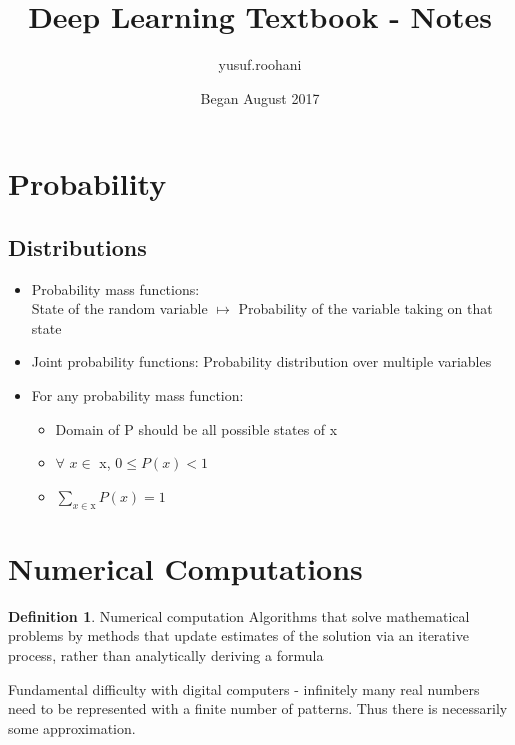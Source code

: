 \documentclass{article}
\title{Deep Learning Textbook - Notes}
\author{yusuf.roohani }
\date{Began August 2017}
\theoremstyle{definition}
\newtheorem{definition}{Definition}[section]
\begin{document}
\maketitle


\section{Probability}

\subsection{Distributions}

\begin{itemize}
    \item Probability mass functions:\\
    State of the random variable $\mapsto$ Probability of the variable taking on that state
    
    \item Joint probability functions:
    Probability distribution over multiple variables
    
    \item 
    For any probability mass function:
    \begin{itemize}
    \item Domain of P should be all possible states of x
    \item $\forall$ $x \in$ x, $ 0 \leq P(x) < 1$
    \item $\sum_{x \in \textrm{x}} P(x) = 1$
    \end{itemize}
\end{itemize}


\section{Numerical Computations}

\begin{definition}{Numerical computation}
Algorithms that solve mathematical problems by methods that update estimates of the solution via an iterative process, rather than analytically deriving a formula
\end{definition}

Fundamental difficulty with digital computers - infinitely many real numbers need to be represented with a finite number of patterns. Thus there is necessarily some approximation.
\end{document}
